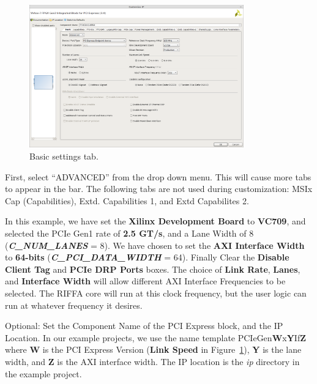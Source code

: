 \documentclass{refrep}
\newcommand{\figurewidth}{350px}
\newcommand{\Directory}[1]{\textit{#1}}
\newcommand{\ConfigSetting}[1]{\textbf{#1}}
\newcommand{\RIFFAParameter}[1]{\textit{\textbf{#1}}}
\begin{document}
\begin{figure}[H]
  \includegraphics[width=\figurewidth,center]{Gen3IntegratedTabBasic.png}
  \caption{Basic settings tab.}
  \label{Fig:Gen3Integrated:Generating:Gen3IntegratedTabBasic}
\end{figure}
First, select ``ADVANCED'' from the drop down menu. This will cause more tabs to
appear in the bar. The following tabs are not used during customization: MSIx Cap (Capabilities),
Extd. Capabilities 1, and Extd Capabilites 2.

In this example, we have set the \ConfigSetting{Xilinx Development Board} to
\ConfigSetting{VC709}, and selected the PCIe Gen1 rate of \ConfigSetting{2.5
  GT/s}, and a Lane Width of 8 (\RIFFAParameter{C\_NUM\_LANES} = 8). We have
chosen to set the \ConfigSetting{AXI Interface Width} to \ConfigSetting{64-bits}
(\RIFFAParameter{C\_PCI\_DATA\_WIDTH} = 64). Finally Clear the
\ConfigSetting{Disable Client Tag} and \ConfigSetting{PCIe DRP Ports} boxes. The
choice of \ConfigSetting{Link Rate}, \ConfigSetting{Lanes}, and
\ConfigSetting{Interface Width} will allow different AXI Interface Frequencies
to be selected. The RIFFA core will run at this clock frequency, but the user
logic can run at whatever frequency it desires.

Optional: Set the Component Name of the PCI Express block, and the IP
Location. In our example projects, we use the name template
PCIeGen\textbf{W}x\textbf{Y}If\textbf{Z} where \textbf{W} is the PCI Express
Version (\ConfigSetting{Link Speed} in
Figure~\ref{Fig:Gen3Integrated:Generating:Gen3IntegratedTabBasic}),
\textbf{Y} is the lane width, and \textbf{Z} is the AXI interface width.  The IP
location is the \Directory{ip} directory in the example project.
\end{document}
